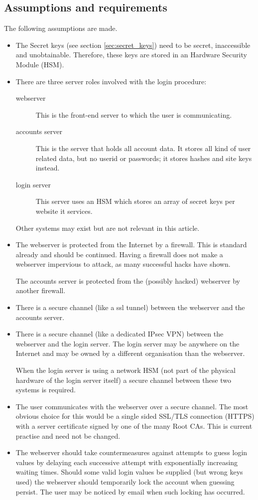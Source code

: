 \subsection{Assumptions and requirements}
The following assumptions are made.
\begin{itemize}
\item	The Secret keys (see section \ref{sec:secret_keys})
need to be secret, inaccessible and unobtainable.
Therefore, these keys are stored in an Hardware Security Module (HSM).
\item	There are three server roles involved with the login procedure:
	\begin{description}
	\item[webserver]	This is the front-end server to which the user is communicating.
	\item[accounts server]	This is the server that holds all account data.
			It stores all kind of user related data, but no userid or passwords;
			it stores hashes and site keys instead.
	\item[login server]	This server uses an HSM which stores an array of secret keys per website it services.
	\end{description}
	Other systems may exist but are not relevant in this article.
\item	The webserver is protected from the Internet by a firewall.
	This is standard already and should be continued.
	Having a firewall does not make a webserver impervious to attack,
	as many successful hacks have shown.
\par	The accounts server is protected from the
	(possibly hacked)
	webserver by another firewall.
\item	There is a secure channel
	(like a ssl tunnel)
	between the webserver and the accounts server.
\item	There is a secure channel
	(like a dedicated IPsec VPN)
	between the webserver and the login server.
	The login server may be anywhere on the Internet and may be owned by a different organisation than the webserver.
\par	When the login server is using a network HSM
	(not part of the physical hardware of the login server itself)
	a secure channel between these two systems is required.
\item	The user communicates with the webserver over a secure channel.
	The most obvious choice for this would be a single sided SSL/TLS connection
	(HTTPS)
	with a server certificate signed by one of the many Root CAs.
	This is current practise and need not be changed.
\item	The webserver should take countermeasures against attempts to guess
	login values by delaying each successive attempt with exponentially increasing waiting times.
	Should some valid login values be supplied
	(but wrong keys used)
	the webserver should temporarily lock the account when guessing persist.
	The user may be noticed by email when such locking has occurred.
\end{itemize}

